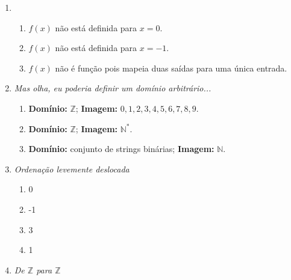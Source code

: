\documentclass{article}
\begin{document}
\begin{enumerate}
    \item 

        \begin{enumerate}

            \item \( f(x) \) não está definida para \( x=0 \).

            \item \( f(x) \) não está definida para \( x=-1 \).

            \item \( f(x) \) não é função pois mapeia duas saídas para uma única entrada.

        \end{enumerate}

    \item \textit{Mas olha, eu poderia definir um domínio arbitrário...}

        \begin{enumerate}

            \item \textbf{Domínio:} \( \mathbb{Z} \); \textbf{Imagem:} \( {0,1,2,3,4,5,6,7,8,9} \).

            \item \textbf{Domínio:} \( \mathbb{Z} \); \textbf{Imagem:} \( \mathbb{N}^* \).

            \item \textbf{Domínio:} conjunto de strings binárias; \textbf{Imagem:} \( \mathbb{N} \).

        \end{enumerate}

    \item \textit{Ordenação levemente deslocada}

        \begin{multicols}{2}
            \begin{enumerate}
                \item 0
                \item -1
                \item 3
                \item 1
            \end{enumerate}
        \end{multicols}

    \item \textit{De \( \mathbb{Z} \) para \( \mathbb{Z} \)}

        \begin{enumerate}


\end{enumerate}
\end{enumerate}
\end{document}
